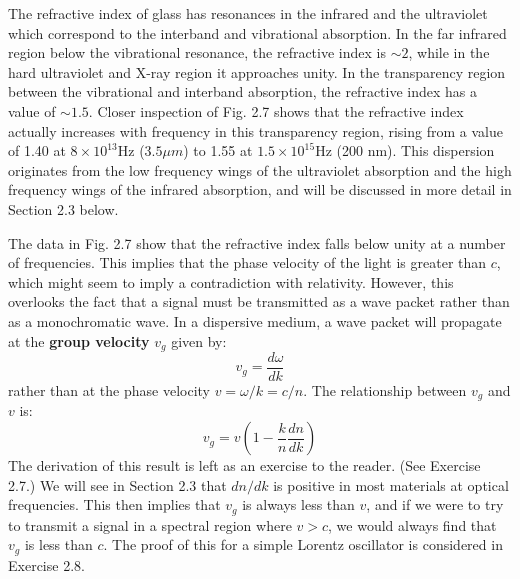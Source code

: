 \documentclass[12pt]{book}
\begin{document}
The refractive index of glass has resonances in the infrared and the ultraviolet which correspond to the interband and vibrational absorption. In the far infrared region below the vibrational resonance, the refractive index is $\sim2$, while in the hard ultraviolet and X-ray region it approaches unity. In the transparency region between the vibrational and interband absorption, the refractive index has a value of $\sim1.5$. Closer inspection of Fig. 2.7 shows that the refractive index actually increases with frequency in this transparency region, rising from a value of 1.40 at $8\times 10^{13}$Hz ($3.5\mu m$) to 1.55 at $1.5\times10^{15}$Hz (200 nm). This dispersion originates from the low frequency wings of the ultraviolet absorption and the high frequency wings of the infrared absorption, and will be discussed in more detail in Section 2.3 below.

The data in Fig. 2.7 show that the refractive index falls below unity at a number of frequencies. This implies that the phase velocity of the light is greater than $c$, which might seem to imply a contradiction with relativity. However, this overlooks the fact that a signal must be transmitted as a wave packet rather than as a monochromatic wave. In a dispersive medium, a wave packet will propagate at the \textbf{group velocity} $v_g$ given by:
\begin{equation}\label{equa:2.25}
  v_g=\frac{d\omega}{dk}
\end{equation}
rather than at the phase velocity $v = \omega/ k = c/n$. The relationship between $v_g$ and $v$ is:
\begin{equation}\label{equa:2.26}
  v_g=v\left(1-\frac{k}{n}\frac{dn}{dk}\right)
\end{equation}
The derivation of this result is left as an exercise to the reader. (See Exercise 2.7.) We will see in Section 2.3 that $dn/dk$ is positive in most materials at optical frequencies. This then implies that $v_g$ is always less than $v$, and if we were to try to transmit a signal in a spectral region where $v > c$, we would always find that $v_g$ is less than $c$. The proof of this for a simple Lorentz oscillator is considered in Exercise 2.8.
\end{document}
